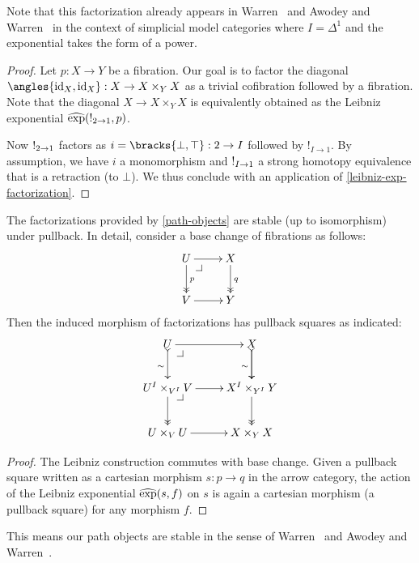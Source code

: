 \documentclass[reqno,10pt,a4paper,oneside]{amsart}
\begin{document}
Note that this factorization already appears in Warren~\cite{warren:thesis} and Awodey and Warren~\cite{awodey-warren:homotopy-idtype} in the context of simplicial model categories where $I = \Delta^1$ and the exponential takes the form of a power.

\begin{proof}
Let $p : X \to Y$ be a fibration.
Our goal is to factor the diagonal $\angles{\id_X, \id_X} : X \to X \times_Y X$ as a trivial cofibration followed by a fibration.
Note that the diagonal $X \to X \times_Y X$ is equivalently obtained as the Leibniz exponential $\operatorname{\widehat{exp}}(\mathord{!}_{2 \to 1}, p)$.

Now $\mathord{!}_{2 \to 1}$ factors as $i = \bracks{\bot, \top} : 2 \to I$ followed by $!_{I \to 1}$.
By assumption, we have $i$ a monomorphism and $\mathord{!}_{I \to 1}$ a strong homotopy equivalence that is a retraction (\eg to $\bot$).
We thus conclude with an application of \cref{leibniz-exp-factorization}.
\end{proof}

\begin{lemma}
\label{path-objects-stable}
The factorizations provided by \cref{path-objects} are stable (up to isomorphism) under pullback.
In detail, consider a base change of fibrations as follows:
\[
\xymatrix{
  U
  \ar[r]
  \ar@{->>}[d]^{p}
  \pullback{dr}
&
  X
  \ar@{->>}[d]^{q}
\\
  V
  \ar[r]
&
  Y
}
\]
Then the induced morphism of factorizations has pullback squares as indicated:
\[
\xymatrix{
  U
  \ar[r]
  \ar@{>->}[d]_{\sim}
  \pullback{dr}
&
  X
  \ar[d]
  \ar@{>->}[d]_{\sim}
\\
  U^I \times_{V^I} V
  \ar[r]
  \ar@{->>}[d]
  \pullback{dr}
&
  X^I \times_{Y^I} Y
  \ar@{->>}[d]
\\
  U \times_V U
  \ar[r]
&
  X \times_Y X  
}
\]
\end{lemma}

\begin{proof}
The Leibniz construction commutes with base change.
Given a pullback square written as a cartesian morphism $s : p \to q$ in the arrow category, the action of the Leibniz exponential $\operatorname{\widehat{exp}}(s, f)$ on $s$ is again a cartesian morphism (\ie a pullback square) for any morphism $f$.
\end{proof}

This means our path objects are stable in the sense of Warren~\cite{warren:thesis} and Awodey and Warren~\cite{awodey-warren:homotopy-idtype}.
\end{document}
